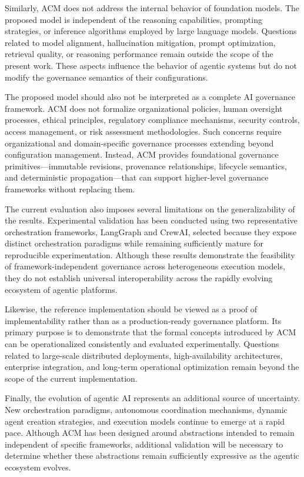 \documentclass[10pt]{article}
\begin{document}
Similarly, ACM does not address the internal behavior of foundation models. The proposed model is independent of the reasoning capabilities, prompting strategies, or inference algorithms employed by large language models. Questions related to model alignment, hallucination mitigation, prompt optimization, retrieval quality, or reasoning performance remain outside the scope of the present work. These aspects influence the behavior of agentic systems but do not modify the governance semantics of their configurations.

The proposed model should also not be interpreted as a complete AI governance framework. ACM does not formalize organizational policies, human oversight processes, ethical principles, regulatory compliance mechanisms, security controls, access management, or risk assessment methodologies. Such concerns require organizational and domain-specific governance processes extending beyond configuration management. Instead, ACM provides foundational governance primitives—immutable revisions, provenance relationships, lifecycle semantics, and deterministic propagation—that can support higher-level governance frameworks without replacing them.

The current evaluation also imposes several limitations on the generalizability of the results. Experimental validation has been conducted using two representative orchestration frameworks, LangGraph and CrewAI, selected because they expose distinct orchestration paradigms while remaining sufficiently mature for reproducible experimentation. Although these results demonstrate the feasibility of framework-independent governance across heterogeneous execution models, they do not establish universal interoperability across the rapidly evolving ecosystem of agentic platforms.

Likewise, the reference implementation should be viewed as a proof of implementability rather than as a production-ready governance platform. Its primary purpose is to demonstrate that the formal concepts introduced by ACM can be operationalized consistently and evaluated experimentally. Questions related to large-scale distributed deployments, high-availability architectures, enterprise integration, and long-term operational optimization remain beyond the scope of the current implementation.

Finally, the evolution of agentic AI represents an additional source of uncertainty. New orchestration paradigms, autonomous coordination mechanisms, dynamic agent creation strategies, and execution models continue to emerge at a rapid pace. Although ACM has been designed around abstractions intended to remain independent of specific frameworks, additional validation will be necessary to determine whether these abstractions remain sufficiently expressive as the agentic ecosystem evolves.
\end{document}
